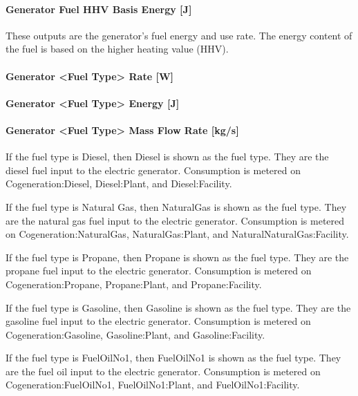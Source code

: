 \paragraph{Generator Fuel HHV Basis Energy {[}J{]}}\label{generator-fuel-hhv-basis-energy-j}

These outputs are the generator's fuel energy and use rate. The energy content of the fuel is based on the higher heating value (HHV).

\paragraph{Generator \textless{}Fuel Type\textgreater{} Rate {[}W{]}}\label{generator-fuel-type-rate-w}

\paragraph{Generator \textless{}Fuel Type\textgreater{} Energy {[}J{]}}\label{generator-fuel-type-energy-j}

\paragraph{Generator \textless{}Fuel Type\textgreater{} Mass Flow Rate {[}kg/s{]}}\label{generator-fuel-type-mass-flow-rate-kgs}

If the fuel type is Diesel, then Diesel is shown as the fuel type. They are the diesel fuel input to the electric generator. Consumption is metered on Cogeneration:Diesel, Diesel:Plant, and Diesel:Facility.

If the fuel type is Natural Gas, then NaturalGas is shown as the fuel type. They are the natural gas fuel input to the electric generator. Consumption is metered on Cogeneration:NaturalGas, NaturalGas:Plant, and NaturalNaturalGas:Facility.

If the fuel type is Propane, then Propane is shown as the fuel type. They are the propane fuel input to the electric generator. Consumption is metered on Cogeneration:Propane, Propane:Plant, and Propane:Facility.

If the fuel type is Gasoline, then Gasoline is shown as the fuel type. They are the gasoline fuel input to the electric generator. Consumption is metered on Cogeneration:Gasoline, Gasoline:Plant, and Gasoline:Facility.

If the fuel type is FuelOilNo1, then FuelOilNo1 is shown as the fuel type. They are the fuel oil input to the electric generator. Consumption is metered on Cogeneration:FuelOilNo1, FuelOilNo1:Plant, and FuelOilNo1:Facility.

